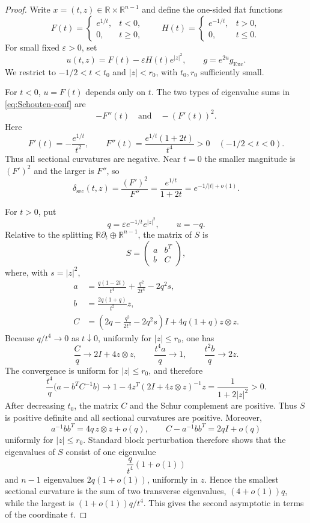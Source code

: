 \documentclass[11pt,reqno]{amsart}
\theoremstyle{definition}
\theoremstyle{remark}
\newcommand{\R}{\mathbb R}
\newcommand{\dsec}{\delta_{\mathrm{sec}}}
\newcommand{\abs}[1]{\lvert #1\rvert}
\newcommand{\eps}{\varepsilon}
\begin{document}
\begin{proof}
Write $x=(t,z)\in\R\times\R^{n-1}$ and define the one-sided flat functions
\[
F(t)=\begin{cases}e^{1/t},&t<0,\\0,&t\ge0,\end{cases}
\qquad
H(t)=\begin{cases}e^{-1/t},&t>0,\\0,&t\le0.\end{cases}
\]
For small fixed $\eps>0$, set
\begin{equation}\label{eq:u-conformal}
u(t,z)=F(t)-\eps H(t)e^{\abs z^2},
\qquad
g=e^{2u}g_{\mathrm{Euc}}.
\end{equation}
We restrict to $-1/2<t<t_0$ and $\abs z<r_0$, with $t_0,r_0$ sufficiently small.

For $t<0$, $u=F(t)$ depends only on $t$.  The two types of eigenvalue sums in \eqref{eq:Schouten-conf} are
\[
-F''(t)
\quad\text{and}\quad
-(F'(t))^2.
\]
Here
\[
F'(t)=-\frac{e^{1/t}}{t^2},
\qquad
F''(t)=\frac{e^{1/t}(1+2t)}{t^4}>0
\quad(-1/2<t<0).
\]
Thus all sectional curvatures are negative.  Near $t=0$ the smaller magnitude is $(F')^2$ and the larger is $F''$, so
\[
\dsec(t,z)=\frac{(F')^2}{F''}
=\frac{e^{1/t}}{1+2t}
=e^{-1/\abs t+o(1)}.
\]

For $t>0$, put
\[
q=\eps e^{-1/t}e^{\abs z^2},
\qquad u=-q.
\]
Relative to the splitting $\R\partial_t\oplus\R^{n-1}$, the matrix of $S$ is
\[
S=\begin{pmatrix}a&b^T\\ b&C\end{pmatrix},
\]
where, with $s=\abs z^2$,
\begin{align*}
a&=\frac{q(1-2t)}{t^4}+\frac{q^2}{2t^4}-2q^2s,\\
b&=\frac{2q(1+q)}{t^2}z,\\
C&=\left(2q-\frac{q^2}{2t^4}-2q^2s\right)I
  +4q(1+q)z\otimes z.
\end{align*}
Because $q/t^4\to0$ as $t\downarrow0$, uniformly for $\abs z\le r_0$, one has
\[
\frac Cq\longrightarrow 2I+4z\otimes z,
\qquad
\frac{t^4a}{q}\longrightarrow1,
\qquad
\frac{t^2b}{q}\longrightarrow2z.
\]
The convergence is uniform for $\abs z\le r_0$, and therefore
\[
\frac{t^4}{q}\bigl(a-b^TC^{-1}b\bigr)
\longrightarrow
1-4z^T(2I+4z\otimes z)^{-1}z
=\frac1{1+2\abs z^2}>0.
\]
After decreasing $t_0$, the matrix $C$ and the Schur complement are positive.  Thus $S$ is positive definite and all sectional curvatures are positive.  Moreover,
\[
a^{-1}bb^T=4q\,z\otimes z+o(q),
\qquad
C-a^{-1}bb^T=2qI+o(q)
\]
uniformly for $\abs z\le r_0$.  Standard block perturbation therefore shows that the eigenvalues of $S$ consist of one eigenvalue
\[
\frac q{t^4}(1+o(1))
\]
and $n-1$ eigenvalues $2q(1+o(1))$, uniformly in $z$.  Hence the smallest sectional curvature is the sum of two transverse eigenvalues, $(4+o(1))q$, while the largest is $(1+o(1))q/t^4$.  This gives the second asymptotic in terms of the coordinate $t$.


\end{proof}
\end{document}
